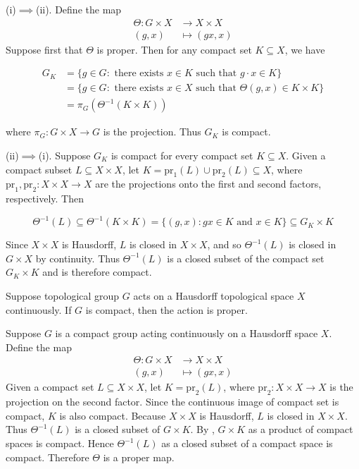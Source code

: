 \documentclass{report}
\begin{document}
\begin{prf}
(i)$\implies$(ii). Define the map
\begin{align*}
	\Theta: G \times X &\longrightarrow X \times X\\
	(g, x) &\longmapsto(g x, x)
\end{align*}
Suppose first that $\Theta$ is proper. Then for any compact set $K \subseteq X$, we have

$$
\begin{aligned}
G_K & =\{g \in G: \text { there exists } x\in K \text { such that } g \cdot x \in K\} \\
& =\{g \in G: \text { there exists } x \in X \text { such that } \Theta(g, x) \in K \times K\} \\
& =\pi_G\left(\Theta^{-1}(K \times K)\right)
\end{aligned}
$$

where $\pi_G: G \times X \rightarrow G$ is the projection. Thus $G_K$ is compact.

(ii)$\implies$(i). Suppose $G_K$ is compact for every compact set $K \subseteq X$. Given a compact subset $L \subseteq X \times X$, let $K=\mathrm{pr}_1(L) \cup \mathrm{pr}_2(L) \subseteq X$, where $\mathrm{pr}_1, \mathrm{pr}_2: X \times X \rightarrow X$ are the projections onto the first and second factors, respectively. Then

$$
\Theta^{-1}(L) \subseteq \Theta^{-1}(K \times K)=\{(g, x): g x \in K \text { and } x \in K\} \subseteq G_K \times K
$$


Since $X\times X$ is Hausdorff, $L$ is closed in $X \times X$, and so $\Theta^{-1}(L)$ is closed in $G \times X$ by continuity. Thus $\Theta^{-1}(L)$ is a closed subset of the compact set $G_K \times K$ and is therefore compact.
\end{prf}


\begin{proposition}{}{}
	Suppose topological group $G$ acts on a Hausdorff topological space $X$ continuously. If $G$ is compact, then the action is proper.
\end{proposition}
\begin{prf}
	Suppose $G$ is a compact group acting continuously on a Hausdorff space $X$. Define the map
	\begin{align*}
		\Theta: G \times X &\longrightarrow X \times X\\
		(g, x) &\longmapsto(g x, x)
	\end{align*}
	Given a compact set $L \subseteq X \times X$, let $K=\mathrm{pr}_2(L)$, where $\mathrm{pr}_2: X \times X \rightarrow X$ is the projection on the second factor. Since the continuous image of compact set is compact, $K$ is also compact. Because $X \times X$ is Hausdorff, $L$ is closed in $X \times X$. Thus $\Theta^{-1}(L)$ is a closed subset of $G \times K$. By , $G \times K$ as a product of compact spaces is compact. Hence $\Theta^{-1}(L)$ as a closed subset of a compact space is compact. Therefore $\Theta$ is a proper map.
\end{prf}
\end{document}
